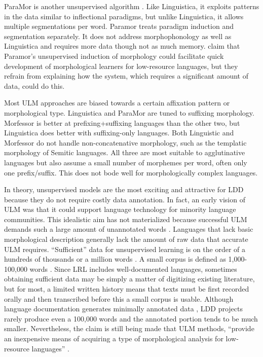 \documentclass[12pt]{article}
\begin{document}
ParaMor is another unsupervised algorithm \cite{monson_unsupervised_2004,monson_paramorMinimally_2007a,monson_paramorfinding_2007b,monson_evaluating_2008}. Like Linguistica, it exploits patterns in the data similar to inflectional paradigms, but unlike Linguistica, it allows multiple segmentations per word. Paramor treats paradigm induction and segmentation separately. It does not address morphophonology as well as Linguistica and requires more data though not as much memory.  claim that Paramor’s unsupervised induction of morphology could facilitate quick development of morphological learners for low-resource languages, but they refrain from explaining how the system, which requires a significant amount of data, could do this.

Most ULM approaches are biased towards a certain affixation pattern or morphological type. Linguistica and ParaMor are tuned to suffixing morphology. Morfessor is better at prefixing+suffixing languages than the other two, but Linguistica does better with suffixing-only languages. Both Linguistic and Morfessor do not handle non-concatenative morphology, such as the templatic morphology of Semitic languages. All three are most suitable to agglutinative languages but also assume a small number of morphemes per word, often only one prefix/suffix. This does not bode well for morphologically complex languages. 

In theory, unsupervised models are the most exciting and attractive for LDD because they do not require costly data annotation. In fact, an early vision of ULM was that it could support language technology for minority language communities. This idealistic aim has not materialized because successful ULM demands such a large amount of unannotated words \cite{ruokolainen_comparative_2016}. Languages that lack basic morphological description generally lack the amount of raw data that accurate ULM requires. ``Sufficient'' data for unsupervised learning is on the order of a hundreds of thousands or a million words \cite{rocio_detection_2007}. A small corpus is defined as 1,000-100,000 words \cite{kirschenbaum_unsupervised_2012}. Since LRL includes well-documented languages, sometimes obtaining sufficient data may be simply a matter of digitizing existing literature, but for most, a limited written history means that texts must be first recorded orally and then transcribed before this a small corpus is usable. Although language documentation generates minimally annotated data \cite{himmelmann_documentary_1998,lehmann_documentation_1999}, LDD projects rarely produce even a 100,000 words and the annotated portion tends to be much smaller. Nevertheless, the claim is still being made that ULM methods, ``provide an inexpensive means of acquiring a type of morphological analysis for low-resource  languages'' \cite[p.92]{ruokolainen_comparative_2016}. 
\end{document}
